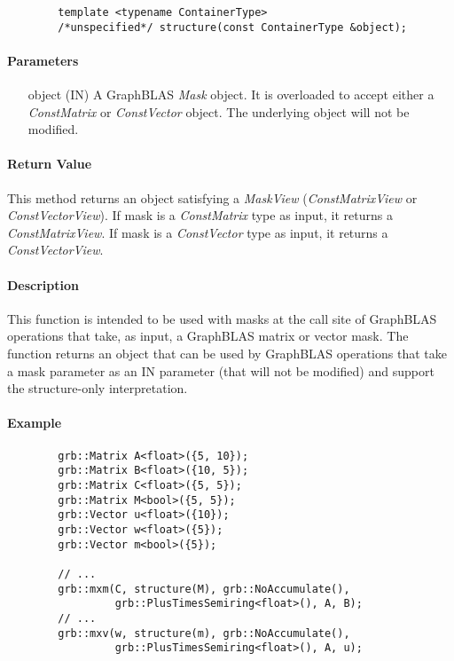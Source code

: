 \begin{verbatim}
        template <typename ContainerType>
        /*unspecified*/ structure(const ContainerType &object);
\end{verbatim}

\paragraph{Parameters}

\begin{itemize}%
    \item[{\sf object}] ({\sf IN}) A GraphBLAS \emph{Mask} object. It is 
    overloaded to accept either a \emph{ConstMatrix} or \emph{ConstVector} 
    object.  The underlying object will not be modified.
\end{itemize}

\paragraph{Return Value}

This method returns an object satisfying a \emph{MaskView} (\emph{ConstMatrixView} or 
\emph{ConstVectorView}). If {\sf mask} is a \emph{ConstMatrix} type as input, 
it returns a \emph{ConstMatrixView}.  If {\sf mask} is a \emph{ConstVector} 
type as input, it returns a \emph{ConstVectorView}.  

\paragraph{Description}

This function is intended to be used with masks at the call site of GraphBLAS 
operations that take, as input, a GraphBLAS matrix or vector mask.  The function 
returns an object that can be used by GraphBLAS operations that take a mask 
parameter as an {\sf IN} parameter (that will not be modified) and support the 
structure-only interpretation.

\paragraph{Example}

\begin{verbatim}
        grb::Matrix A<float>({5, 10});
        grb::Matrix B<float>({10, 5});
        grb::Matrix C<float>({5, 5});
        grb::Matrix M<bool>({5, 5});
        grb::Vector u<float>({10});
        grb::Vector w<float>({5});
        grb::Vector m<bool>({5});
        
        // ...
        grb::mxm(C, structure(M), grb::NoAccumulate(), 
                 grb::PlusTimesSemiring<float>(), A, B);
        // ...
        grb::mxv(w, structure(m), grb::NoAccumulate(), 
                 grb::PlusTimesSemiring<float>(), A, u);
\end{verbatim}


